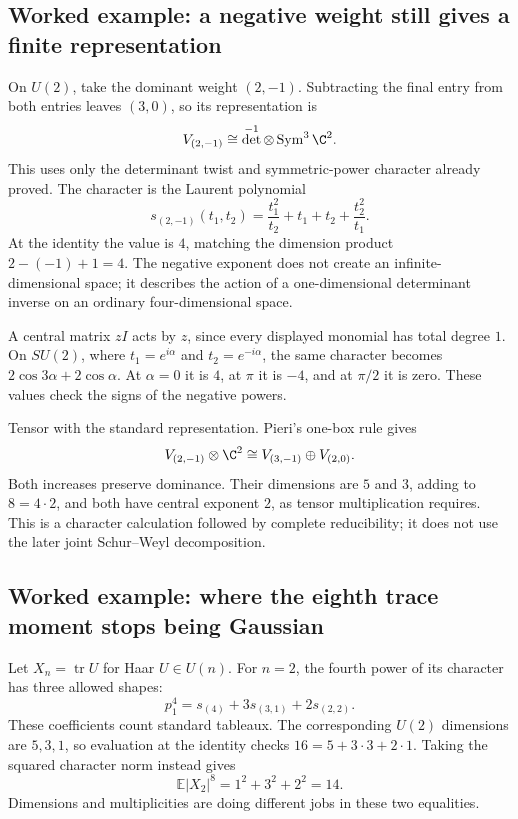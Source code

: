 \subsection*{Worked example: a negative weight still gives a finite representation}

On $U(2)$, take the dominant weight $(2,-1)$. Subtracting the final entry from both entries leaves $(3,0)$, so its representation is
\[
 V_{(2,-1)}\cong\det^{-1}\otimes\operatorname{Sym}^3\C^2.
\]
This uses only the determinant twist and symmetric-power character already proved. The character is the Laurent polynomial
\[
 s_{(2,-1)}(t_1,t_2)
 =\frac{t_1^2}{t_2}+t_1+t_2+\frac{t_2^2}{t_1}.
\]
At the identity the value is $4$, matching the dimension product $2-(-1)+1=4$. The negative exponent does not create an infinite-dimensional space; it describes the action of a one-dimensional determinant inverse on an ordinary four-dimensional space.

A central matrix $zI$ acts by $z$, since every displayed monomial has total degree $1$. On $SU(2)$, where $t_1=e^{i\alpha}$ and $t_2=e^{-i\alpha}$, the same character becomes $2\cos3\alpha+2\cos\alpha$. At $\alpha=0$ it is $4$, at $\pi$ it is $-4$, and at $\pi/2$ it is zero. These values check the signs of the negative powers.

Tensor with the standard representation. Pieri's one-box rule gives
\[
 V_{(2,-1)}\otimes\C^2\cong V_{(3,-1)}\oplus V_{(2,0)}.
\]
Both increases preserve dominance. Their dimensions are $5$ and $3$, adding to $8=4\cdot2$, and both have central exponent $2$, as tensor multiplication requires. This is a character calculation followed by complete reducibility; it does not use the later joint Schur--Weyl decomposition.

\subsection*{Worked example: where the eighth trace moment stops being Gaussian}

Let $X_n=\operatorname{tr}U$ for Haar $U\in U(n)$. For $n=2$, the fourth power of its character has three allowed shapes:
\[
 p_1^4=s_{(4)}+3s_{(3,1)}+2s_{(2,2)}.
\]
These coefficients count standard tableaux. The corresponding $U(2)$ dimensions are $5,3,1$, so evaluation at the identity checks $16=5+3\cdot3+2\cdot1$. Taking the squared character norm instead gives
\[
 \mathbb E|X_2|^8=1^2+3^2+2^2=14.
\]
Dimensions and multiplicities are doing different jobs in these two equalities.

